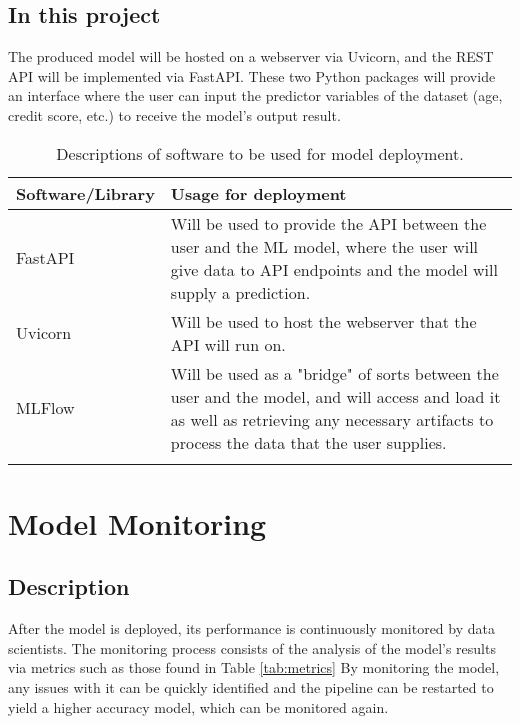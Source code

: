 \subsection{In this project}
The produced model will be hosted on a webserver via Uvicorn, and the REST API will be implemented 
via FastAPI. These two Python packages will provide an interface where the user can input the predictor 
variables of the dataset (age, credit score, etc.) to receive the model's output result.


\begin{longtable}{ |p{}| p{}|}
    \hline
    \cellcolor{blue!25}Software/Library & \cellcolor{blue!25}Usage for deployment\\
    \hline
    FastAPI &
    Will be used to provide the API between the user and the ML model, where the user will 
    give data to API endpoints and the model will supply a prediction.\\
    \hline
    Uvicorn &
    Will be used to host the webserver that the API will run on.\\
    \hline
    MLFlow &
    Will be used as a "bridge" of sorts between the user and the model, and will access and load 
    it as well as retrieving any necessary artifacts to process the data that the user supplies.\\
    \hline
\caption{Descriptions of software to be used for model deployment.}\label{tab:DeploymentSoftware}
\end{longtable}



\section{Model Monitoring}\label{sec:Monitoring}
\subsection{Description}
After the model is deployed, its performance is continuously monitored by data scientists. The monitoring 
process consists of the analysis of the model's results via metrics such as those found in Table \ref{tab:metrics}
By monitoring the model, any issues with it can be quickly identified and the pipeline can be restarted to 
yield a higher accuracy model, which can be monitored again.  

